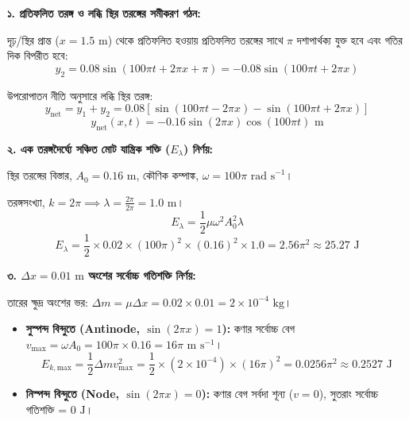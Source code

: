 \documentclass[12pt, a4paper]{article}
\begin{document}
\begin{tcolorbox}[solutionbox={সমাধান (Solution)}]
\noindent
\textbf{১. প্রতিফলিত তরঙ্গ ও লব্ধি স্থির তরঙ্গের সমীকরণ গঠন:}

\vspace{0.3em}
\noindent
দৃঢ়/স্থির প্রান্ত ($x = 1.5\text{ m}$) থেকে প্রতিফলিত হওয়ায় প্রতিফলিত তরঙ্গের সাথে $\pi$ দশাপার্থক্য যুক্ত হবে এবং গতির দিক বিপরীত হবে:
\[ y_2 = 0.08 \sin(100\pi t + 2\pi x + \pi) = -0.08 \sin(100\pi t + 2\pi x) \]

\noindent
উপরোপাতন নীতি অনুসারে লব্ধি স্থির তরঙ্গ:
\[ y_{\text{net}} = y_1 + y_2 = 0.08 \left[\sin(100\pi t - 2\pi x) - \sin(100\pi t + 2\pi x)\right] \]
\[ y_{\text{net}}(x,t) = -0.16 \sin(2\pi x) \cos(100\pi t)\text{ m} \]

\vspace{1em}
\noindent
\textbf{২. এক তরঙ্গদৈর্ঘ্যে সঞ্চিত মোট যান্ত্রিক শক্তি ($E_\lambda$) নির্ণয়:}

\vspace{0.3em}
\noindent
স্থির তরঙ্গের বিস্তার, $A_0 = 0.16\text{ m}$, কৌণিক কম্পাঙ্ক, $\omega = 100\pi\text{ rad s}^{-1}$।
\par\noindent
তরঙ্গসংখ্যা, $k = 2\pi \implies \lambda = \frac{2\pi}{2\pi} = 1.0\text{ m}$।
\[ E_\lambda = \frac{1}{2} \mu \omega^2 A_0^2 \lambda \]
\[ E_\lambda = \frac{1}{2} \times 0.02 \times (100\pi)^2 \times (0.16)^2 \times 1.0 = 2.56\pi^2 \approx 25.27\text{ J} \]

\vspace{1em}
\noindent
\textbf{৩. $\Delta x = 0.01\text{ m}$ অংশের সর্বোচ্চ গতিশক্তি নির্ণয়:}

\vspace{0.3em}
\noindent
তারের ক্ষুদ্র অংশের ভর: $\Delta m = \mu \Delta x = 0.02 \times 0.01 = 2 \times 10^{-4}\text{ kg}$।
\begin{itemize}[leftmargin=2em, itemsep=0.3em]
    \item \textbf{সুস্পন্দ বিন্দুতে (Antinode, $\sin(2\pi x) = 1$):} কণার সর্বোচ্চ বেগ $v_{\max} = \omega A_0 = 100\pi \times 0.16 = 16\pi\text{ m s}^{-1}$।
    \[ E_{k, \text{max}} = \frac{1}{2} \Delta m v_{\max}^2 = \frac{1}{2} \times (2 \times 10^{-4}) \times (16\pi)^2 = 0.0256\pi^2 \approx 0.2527\text{ J} \]
    \item \textbf{নিস্পন্দ বিন্দুতে (Node, $\sin(2\pi x) = 0$):} কণার বেগ সর্বদা শূন্য ($v = 0$), সুতরাং সর্বোচ্চ গতিশক্তি = $0\text{ J}$।
\end{itemize}


\end{tcolorbox}
\end{document}
